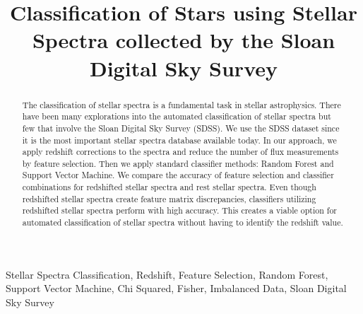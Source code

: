 \documentclass[conference]{IEEEtran}
\begin{document}
%
\title{Classification of Stars using Stellar Spectra collected by the Sloan Digital Sky Survey}

\author{
\and
{}
}


\maketitle

\begin{abstract}
The classification of stellar spectra is a fundamental task in stellar astrophysics. There have been many explorations into the
automated classification of stellar spectra but few that involve the Sloan Digital Sky Survey (SDSS). We use the SDSS dataset since it is the most important stellar spectra database available today. In our approach, we apply redshift corrections to the
spectra and reduce the number of flux measurements by feature selection. Then we apply standard classifier methods: Random
Forest and Support Vector Machine. We compare the accuracy of feature selection and classifier combinations
for redshifted stellar spectra and rest stellar spectra. Even though redshifted stellar spectra create feature matrix discrepancies,
classifiers utilizing redshifted stellar spectra perform with high accuracy. This creates a viable option for automated classification
of stellar spectra without having to identify the redshift value.
\end{abstract}

\IEEEpeerreviewmaketitle
\begin{IEEEkeywords} 
Stellar Spectra Classification, Redshift, Feature Selection, Random Forest, Support Vector Machine, Chi Squared, Fisher, Imbalanced Data,  Sloan Digital Sky Survey
\end{IEEEkeywords} 
\end{document}
